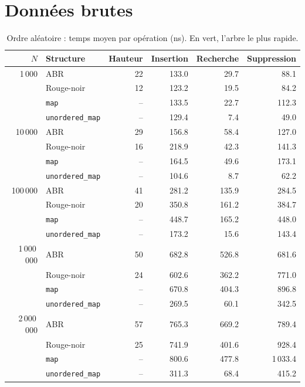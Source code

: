 \documentclass[12pt,a4paper]{report}
\newcommand{\g}{\cellcolor{ok}}
\begin{document}
\section{Données brutes}
\begin{table}[H]
\centering
\caption{Ordre aléatoire : temps moyen par opération (ns). En vert, l'arbre le plus rapide.}
\small
\begin{tabular}{rlrrrr}
  \toprule
  $N$ & Structure & Hauteur & Insertion & Recherche & Suppression \\
  \midrule
  1\,000 & ABR & 22 & 133.0 & 29.7 & 88.1 \\
         & Rouge-noir & 12 & \g 123.2 & \g 19.5 & \g 84.2 \\
         & \texttt{map} & -- & 133.5 & 22.7 & 112.3 \\
         & \texttt{unordered\_map} & -- & 129.4 & 7.4 & 49.0 \\
  \midrule
  10\,000 & ABR & 29 & \g 156.8 & 58.4 & \g 127.0 \\
          & Rouge-noir & 16 & 218.9 & \g 42.3 & 141.3 \\
          & \texttt{map} & -- & 164.5 & 49.6 & 173.1 \\
          & \texttt{unordered\_map} & -- & 104.6 & 8.7 & 62.2 \\
  \midrule
  100\,000 & ABR & 41 & \g 281.2 & \g 135.9 & \g 284.5 \\
           & Rouge-noir & 20 & 350.8 & 161.2 & 384.7 \\
           & \texttt{map} & -- & 448.7 & 165.2 & 448.0 \\
           & \texttt{unordered\_map} & -- & 173.2 & 15.6 & 143.4 \\
  \midrule
  1\,000\,000 & ABR & 50 & 682.8 & 526.8 & \g 681.6 \\
              & Rouge-noir & 24 & \g 602.6 & \g 362.2 & 771.0 \\
              & \texttt{map} & -- & 670.8 & 404.3 & 896.8 \\
              & \texttt{unordered\_map} & -- & 269.5 & 60.1 & 342.5 \\
  \midrule
  2\,000\,000 & ABR & 57 & 765.3 & 669.2 & \g 789.4 \\
              & Rouge-noir & 25 & \g 741.9 & \g 401.6 & 928.4 \\
              & \texttt{map} & -- & 800.6 & 477.8 & 1\,033.4 \\
              & \texttt{unordered\_map} & -- & 311.3 & 68.4 & 415.2 \\
  \bottomrule
\end{tabular}
\end{table}
\end{document}
